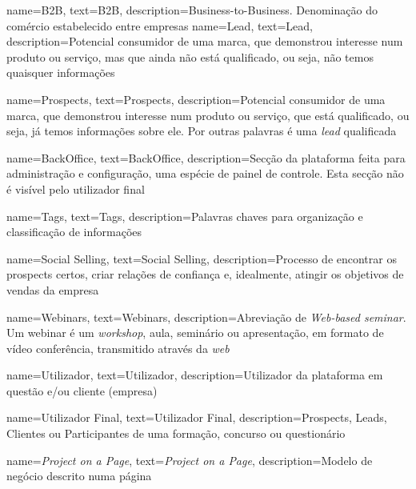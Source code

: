 {
        name=B2B,
        text=B2B,
        description={Business-to-Business. Denominação do comércio estabelecido entre empresas}
}
{
	name=Lead,
	text=Lead,
	description={Potencial consumidor de uma marca, que demonstrou interesse num produto ou serviço, mas que ainda não está qualificado, ou seja, não temos quaisquer informações}
}

{
	name=Prospects,
	text=Prospects,
	description={Potencial consumidor de uma marca, que demonstrou interesse num produto ou serviço, que está qualificado, ou seja, já temos informações sobre ele. Por outras palavras é uma \textit{lead} qualificada}
}

{
	name=BackOffice,
	text=BackOffice,
	description={Secção da plataforma feita para administração e configuração, uma espécie de painel de controle. Esta secção não é visível pelo utilizador final}
}

{
	name=Tags,
	text=Tags,
	description={Palavras chaves para organização e classificação de informações}
}

{
	name=Social Selling,
	text=Social Selling,
	description={Processo de encontrar os prospects certos, criar relações de confiança e, idealmente, atingir os objetivos de vendas da empresa}
}

{
	name=Webinars,
	text=Webinars,
	description={Abreviação de \textit{Web-based seminar}. Um webinar é um \textit{workshop}, aula, seminário ou apresentação, em formato de vídeo conferência, transmitido através da \textit{web}}
}

{
	name=Utilizador,
	text=Utilizador,
	description={Utilizador da plataforma em questão e/ou cliente (empresa)}
}

{
	name=Utilizador Final,
	text=Utilizador Final,
	description={Prospects, Leads, Clientes ou Participantes de uma formação, concurso ou questionário}
}

{
	name=\textit{Project on a Page},
	text=\textit{Project on a Page},
	description={Modelo de negócio descrito numa página}
}


